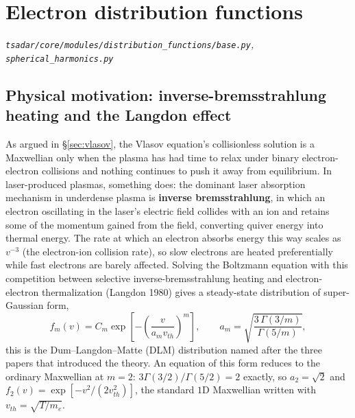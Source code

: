 \documentclass[11pt]{article}
\newcommand{\file}[1]{\texttt{#1}}
\begin{document}
\section{Electron distribution functions}\label{sec:edf}
\textit{\file{tsadar/core/modules/distribution\_functions/base.py}, \file{spherical\_harmonics.py}}

\subsection{Physical motivation: inverse-bremsstrahlung heating and the Langdon effect}\label{sec:dlm-physics}

As argued in \S\ref{sec:vlasov}, the Vlasov equation's collisionless solution is a
Maxwellian only when the plasma has had time to relax under binary electron-electron
collisions and nothing continues to push it away from equilibrium. In laser-produced
plasmas, something does: the dominant laser absorption mechanism in underdense plasma is
\textbf{inverse bremsstrahlung}, in which an electron oscillating in the laser's electric
field collides with an ion and retains some of the momentum gained from the field,
converting quiver energy into thermal energy. The rate at which an electron absorbs energy
this way scales as $v^{-3}$ (the electron-ion collision rate), so slow electrons are
heated preferentially while fast electrons are barely affected. Solving the
Boltzmann equation with this competition between selective inverse-bremsstrahlung heating
and electron-electron thermalization (Langdon 1980) gives a steady-state distribution of
super-Gaussian form,
\begin{equation}\label{eq:dlm-physics}
  f_m(v) = C_m\exp\!\left[-\left(\frac{v}{a_mv_{th}}\right)^m\right], \qquad
  a_m = \sqrt{\frac{3\,\Gamma(3/m)}{\Gamma(5/m)}},
\end{equation}
this is the Dum--Langdon--Matte (DLM) distribution named after the three papers that introduced the theory.
An equation of this form reduces to the ordinary Maxwellian at $m=2$: $3\Gamma(3/2)/\Gamma(5/2)=2$
exactly, so $a_2=\sqrt2$ and $f_2(v)=\exp[-v^2/(2v_{th}^2)]$, the standard $1$D Maxwellian
written with $v_{th}=\sqrt{T/m_e}$. 
\end{document}
